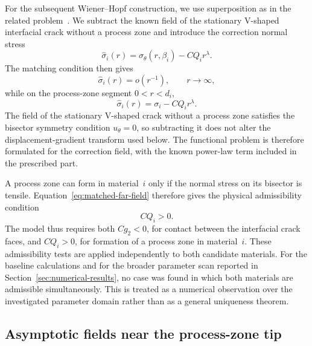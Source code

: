 \documentclass[pdflatex,onecolumn,sn-mathphys-ay]{sn-jnl}
\begin{document}
For the subsequent Wiener--Hopf construction, we use superposition as in
the related problem~\citep{KaminskyDudykPolishchuk2024}. We subtract the known field of the stationary V-shaped interfacial crack
without a process zone and introduce the correction normal stress
\begin{equation*}
  \widehat{\sigma}_i(r)
  =\sigma_\theta(r,\beta_i)-CQ_i r^\lambda.
\end{equation*}
The matching condition then gives
\begin{equation*}
  \widehat{\sigma}_i(r)=o(r^{-1}),
  \qquad r\to\infty,
\end{equation*}
while on the process-zone segment $0<r<d_i$,
\begin{equation*}
  \widehat{\sigma}_i(r)
  =\sigma_i-CQ_i r^\lambda.
\end{equation*}
The field of the stationary V-shaped crack without a process zone satisfies
the bisector symmetry condition $u_\theta=0$, so subtracting it does not alter the displacement-gradient
transform used below. The functional problem is therefore formulated for the correction field,
with the known power-law term included in the prescribed part.

A process zone can form in material~$i$ only if the normal stress on its
bisector is tensile. Equation~\eqref{eq:matched-far-field} therefore gives
the physical admissibility condition
\begin{equation*}
  CQ_i>0.
\end{equation*}
The model thus requires both $Cg_2<0$, for contact between the
interfacial crack faces, and $CQ_i>0$, for formation of a process zone
in material~$i$. These admissibility tests are applied independently to
both candidate materials. For the baseline calculations and for the broader
parameter scan reported in Section~\ref{sec:numerical-results}, no case was
found in which both materials are admissible simultaneously. This is treated
as a numerical observation over the investigated parameter domain rather
than as a general uniqueness theorem.

\subsection{Asymptotic fields near the process-zone tip}
\label{subsec:zone-tip-asymptotics}
\end{document}
